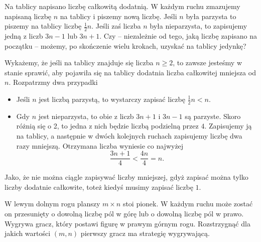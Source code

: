 \newpage
{}

\begin{problem}{1}
	Na tablicy napisano liczbę całkowitą dodatnią. W każdym ruchu zmazujemy napisaną liczbę $n$ na tablicy i piszemy nową liczbę. Jeśli $n$ była parzysta to piszemy na tablicy liczbę $\frac{1}{2}n$. Jeśli zaś liczba $n$ była nieparzysta, to zapisujemy jedną z liczb $3n - 1$ lub $3n + 1$. Czy -- niezależnie od tego, jaką liczbę zapisano na początku -- możemy, po skończenie wielu krokach, uzyskać na tablicy jedynkę?
\end{problem}


\noindent
Wykażemy, że jeśli na tablicy znajduje się liczba $n \geqslant 2$, to zawsze jesteśmy w stanie sprawić, aby pojawiła się na tablicy dodatnia liczba całkowitej mniejsza od $n$. Rozpatrzmy dwa przypadki
\begin{itemize}
	\item Jeśli $n$ jest liczbą parzystą, to wystarczy zapisać liczbę $\frac{1}{2}n < n$.
	\item Gdy $n$ jest nieparzysta, to obie z liczb $3n + 1$ i $3n - 1$ są parzyste. Skoro różnią się o 2, to jedna z nich będzie liczbą podzielną przez $4$. Zapisujemy ją na tablicy, a następnie w dwóch kolejnych ruchach zapisujemy liczbę dwa razy mniejszą. Otrzymana liczba wyniesie co najwyżej
	\[
		\frac{3n + 1}{4} < \frac{4n}{4} = n.
	\]
\end{itemize}
Jako, że nie można ciągle zapisywać liczby mniejszej, gdyż zapisać można tylko liczby dodatnie całkowite, toteż kiedyś musimy zapisać liczbę $1$.

\begin{problem}{2}
	W lewym dolnym rogu planszy $m \times n$ stoi pionek. W każdym ruchu może zostać on przesunięty o dowolną liczbę pól w górę lub o dowolną liczbę pól w prawo. Wygrywa gracz, który postawi figurę w prawym górnym rogu. Rozstrzygnąć dla jakich wartości $(m, n)$ pierwszy gracz ma strategię wygrywającą.
\end{problem}



